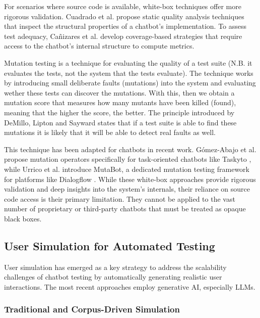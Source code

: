 For scenarios where source code is available,
white-box techniques offer more rigorous validation.
Cuadrado et al. \autocite{cuadradoIntegratingStaticQuality2024}
propose static quality analysis techniques
that inspect the structural properties of a chatbot's implementation.
To assess test adequacy, Cañizares et al.
\autocite{canizaresCoveragebasedStrategiesAutomated2024}
develop coverage-based strategies that
require access to the chatbot's internal structure to compute metrics.

Mutation testing is a technique for evaluating
the quality of a test suite
(N.B. it evaluates the tests, not the system that the tests evaluate).
The technique works by introducing
small deliberate faults (mutations) into the system
and evaluating wether these tests can discover the mutations.
With this, then we obtain a mutation score
that measures how many mutants have been killed (found),
meaning that the higher the score, the better.
The principle introduced by DeMillo, Lipton and Sayward
\autocite{demilloHintsTestData1978}
states that if a test suite is able to find these mutations
it is likely that it will be able to detect real faults as well.

This technique has been adapted for chatbots in recent work.
Gómez-Abajo et al. \autocite{gomez-abajoMutationTestingTaskOriented2024}
propose mutation operators specifically for task-oriented chatbots like Taskyto \autocite{sanchezcuadradoAutomatingDevelopmentTaskoriented2024},
while Urrico et al. \autocite{urricoMutaBotMutationTesting2024} introduce MutaBot,
a dedicated mutation testing framework for platforms like Dialogflow \autocite{Dialogflow}.
While these white-box approaches provide rigorous validation
and deep insights into the system's internals,
their reliance on source code access
is their primary limitation.
They cannot be applied to the vast number of
proprietary or third-party chatbots
that must be treated as opaque black boxes.

\subsection{User Simulation for Automated Testing}

User simulation has emerged as a key strategy to
address the scalability challenges of chatbot testing
by automatically generating realistic user interactions.
The most recent approaches employ generative \acl{AI},
especially \acp{LLM}.

\subsubsection{Traditional and Corpus-Driven Simulation}

